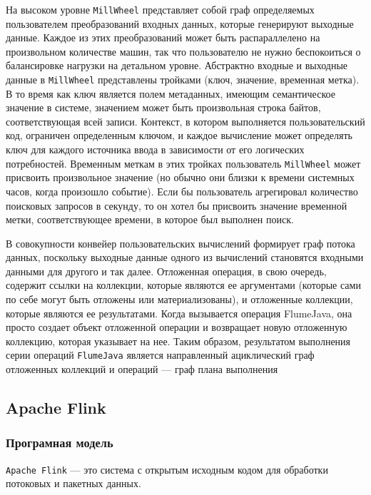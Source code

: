 На высоком уровне \texttt{MillWheel} представляет собой граф определяемых пользователем преобразований входных данных, которые генерируют выходные данные. Каждое из этих преобразований может быть распараллелено на произвольном количестве машин, так что пользователю не нужно беспокоиться о балансировке нагрузки на детальном уровне. Абстрактно входные и выходные данные в \texttt{MillWheel} представлены тройками (ключ, значение, временная метка). 
В то время как ключ является полем метаданных, имеющим семантическое значение в системе, значением может быть произвольная строка байтов, соответствующая всей записи. 
Контекст, в котором выполняется пользовательский код, ограничен определенным ключом, и каждое вычисление может определять ключ для каждого источника ввода в зависимости от его логических потребностей. 
Временным меткам в этих тройках пользователь \texttt{MillWheel} может присвоить произвольное значение (но обычно они близки к времени системных часов, когда произошло событие). Если бы пользователь агрегировал количество поисковых запросов в секунду, то он хотел бы присвоить значение временной метки, соответствующее времени, в которое был выполнен поиск.

В совокупности конвейер пользовательских вычислений формирует граф потока данных, поскольку выходные данные одного из вычислений становятся входными данными для другого и так далее.
Отложенная операция, в свою очередь, содержит ссылки на коллекции, которые являются ее аргументами (которые сами по себе могут быть отложены или материализованы), и отложенные коллекции, которые являются ее результатами. Когда вызывается операция FlumeJava, она просто создает объект отложенной операции и возвращает новую отложенную коллекцию, которая указывает на нее. 
Таким образом, результатом выполнения серии операций \texttt{FlumeJava} является направленный ациклический граф отложенных коллекций и операций --- граф плана выполнения

\subsection{Apache Flink}

\subsubsection{Програмная модель}

\texttt{Apache Flink} --- это система с открытым исходным кодом для обработки потоковых и пакетных данных.

